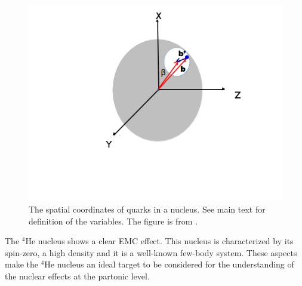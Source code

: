 \begin{figure}[tbp]
\centering
\includegraphics[scale=0.6]{fig/quarks_nucleus.png}
\vspace{-0.7in}
\caption{The spatial coordinates of quarks in a nucleus. See main text for definition of the variables. The figure is from \cite{simonetta_pre}. } 
\label{fig:quarks_nucleus}
\end{figure}

The $^4$He nucleus shows a clear EMC effect. This nucleus is characterized by its spin-zero, a high density and it is a well-known few-body system. These aspects make the $^4$He nucleus an ideal target to be considered for the understanding of the nuclear effects at the partonic level. \\ 
  
